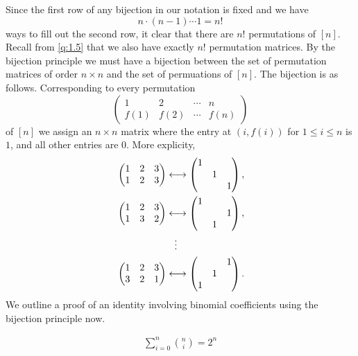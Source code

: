 Since the first row of any bijection in our notation is fixed and we have \[ n\cdot\left( n-1 \right) \cdots 1 = n!\] ways to fill out the second row, it clear that there are $n!$ permutations of $[n]$. Recall from \cref{q:1.5} that we also have exactly $n!$ permutation matrices. By the bijection principle we must have a bijection between the set of permutation matrices of order $n\times n$ and the set of permuations of $[n]$. The bijection is as follows. Corresponding to every permutation \[
\begin{pmatrix} 
	1 & 2 & \cdots & n \\
	f\left(1\right) & f\left( 2 \right) & \cdots & f\left( n \right)
\end{pmatrix} 
\] of $[n]$ we assign an $n\times n$ matrix where the entry at $\left( i,f\left(i  \right)  \right)$ for $1\leq i\leq n$ is $1$, and all other entries are $0$. More explicity,
\begin{align*}
    &\begin{pmatrix}
    1 & 2 & 3 \\
    1 & 2 & 3 
\end{pmatrix}
\longleftrightarrow
\begin{pmatrix}
    1&& \\
    &1& \\
    &&1
\end{pmatrix}, \\
&\begin{pmatrix}
    1 & 2 & 3 \\
    1 & 3 & 2 
\end{pmatrix}
\longleftrightarrow
\begin{pmatrix}
    1&& \\
    &&1 \\
    &1&
\end{pmatrix}, \\
&\hspace*{6em}\vdots \\
&\begin{pmatrix}
    1 & 2 & 3 \\
    3 & 2 & 1
\end{pmatrix}
\longleftrightarrow
\begin{pmatrix}
    &&1\\
    &1&\\
    1&&
\end{pmatrix}.
\end{align*}
We outline a proof of an identity involving binomial coefficients using the bijection principle now.
\begin{claim}
\begin{align*}
\sum_{i=0}^{n}\binom{n}{i} = 2^n
\end{align*}
\label{c:2.1}
\end{claim}

